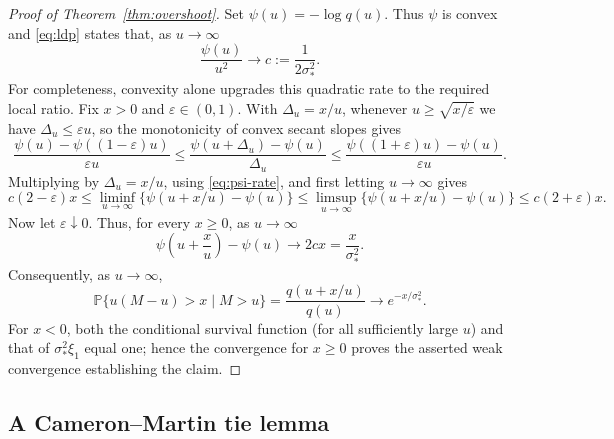 \documentclass[11pt]{amsart}
\theoremstyle{definition}
\theoremstyle{remark}
\newcommand{\Pp}{\mathbb P}
\begin{document}
\begin{proof}[Proof of Theorem~\ref{thm:overshoot}]
Set $\psi(u)=-\log q(u)$.  Thus $\psi$ is convex and \eqref{eq:ldp}
states that, as $u\to\infty$
\begin{equation}
 \frac{\psi(u)}{u^2}\longrightarrow
 c:=\frac1{2\sigma_*^2}.
 \label{eq:psi-rate}
\end{equation}
For completeness, convexity alone upgrades this quadratic rate to the
required local ratio.  Fix $x>0$ and $\varepsilon\in(0,1)$.  With
$\Delta_u=x/u$, whenever $u\geq\sqrt{x/\varepsilon}$ we have
$\Delta_u\leq\varepsilon u$, so the monotonicity of convex secant slopes
gives
\[
 \frac{\psi(u)-\psi((1-\varepsilon)u)}{\varepsilon u}
 \leq \frac{\psi(u+\Delta_u)-\psi(u)}{\Delta_u}
 \leq \frac{\psi((1+\varepsilon)u)-\psi(u)}{\varepsilon u}.
\]
Multiplying by $\Delta_u=x/u$, using \eqref{eq:psi-rate}, and first letting
$u\to\infty$ gives
\[
 c(2-\varepsilon)x
 \leq\liminf_{u\to\infty}\{\psi(u+x/u)-\psi(u)\}
 \leq\limsup_{u\to\infty}\{\psi(u+x/u)-\psi(u)\}
 \leq c(2+\varepsilon)x.
\]
Now let $\varepsilon\downarrow0$.  Thus, for every $x\geq0$, as $u\to\infty$
\begin{equation}
 \psi\left(u+\frac xu\right)-\psi(u)
 \longrightarrow2cx=\frac{x}{\sigma_*^2}.
 \label{eq:local-tail}
\end{equation}
Consequently, as $u\to\infty$,
\[
 \Pp\{u(M-u)>x\mid M>u\}
 =\frac{q(u+x/u)}{q(u)}
 \longrightarrow e^{-x/\sigma_*^2}.
\]
For $x<0$, both the conditional survival function (for all sufficiently
large $u$) and that of $\sigma_*^2\xi_1$ equal one;
hence the convergence for $x\geq0$ proves the asserted weak convergence establishing the claim.  
\end{proof}

\subsection{A Cameron--Martin tie lemma}
\end{document}
